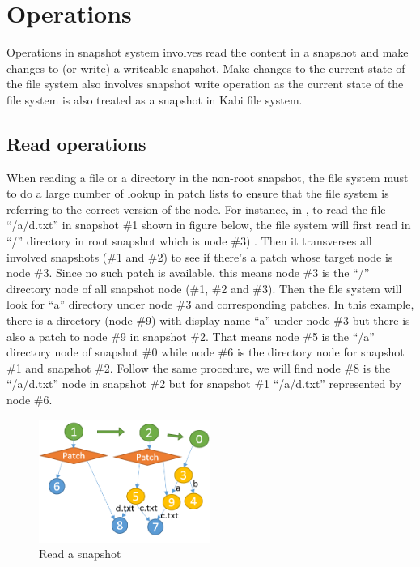 \section{Operations}

    Operations in snapshot system involves read the content in a snapshot and make changes to (or write) a writeable snapshot. Make changes to the current state of the file system also involves snapshot write operation as the current state of the file system is also treated as a snapshot in Kabi file system.

\subsection{Read operations}

    When reading a file or a directory in the non-root snapshot, the file system must to do a large number of lookup in patch lists to ensure that the file system is referring to the correct version of the node. For instance, in  , to read the file ``/a/d.txt'' in snapshot \#1 shown in figure below, the file system will first read in ``/'' directory in root snapshot which is node \#3) . Then it transverses all involved snapshots (\#1 and \#2) to see if there's a patch whose target node is node \#3. Since no such patch is available, this means node \#3 is the ``/'' directory node of all snapshot node (\#1, \#2 and \#3). Then the file system will look for “a” directory under node \#3 and corresponding patches. In this example, there is a directory (node \#9) with display name “a” under node \#3 but there is also a patch to node \#9 in snapshot \#2. That means node \#5 is the ``/a'' directory node of snapshot \#0 while node \#6 is the directory node for snapshot \#1 and snapshot \#2. Follow the same procedure, we will find node \#8 is the ``/a/d.txt'' node in snapshot \#2 but for snapshot \#1 ``/a/d.txt'' represented by node \#6.

\begin{figure}[hbtp]
\centering
\includegraphics[width=0.5\textwidth]{Chapter-4/figs/fig18.png}
\caption{Read a snapshot}
\label{fig:read_patches}
\end{figure}

